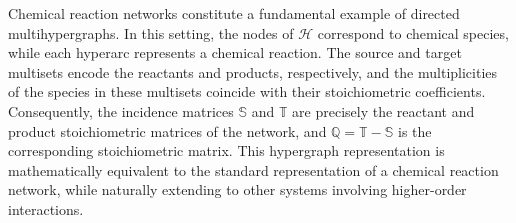 \documentclass[a4paper,11pt,reqno]{amsart}
\begin{document}
Chemical reaction networks constitute a fundamental example of directed
multihypergraphs. In this setting, the nodes of $\mathcal{H}$ correspond to
chemical species, while each hyperarc represents a chemical reaction. The
source and target multisets encode the reactants and products, respectively,
and the multiplicities of the species in these multisets coincide with their
stoichiometric coefficients. Consequently, the incidence matrices
$\mathbb{S}$ and $\mathbb{T}$ are precisely the reactant and product
stoichiometric matrices of the network, and
$\mathbb{Q}=\mathbb{T}-\mathbb{S}$ is the corresponding stoichiometric matrix.
This hypergraph representation is mathematically equivalent to the standard
representation of a chemical reaction network, while naturally extending to
other systems involving higher-order interactions.
\end{document}
